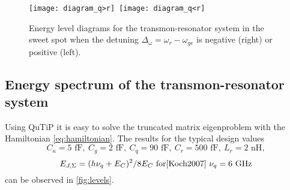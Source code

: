 \begin{figure}[h]
\centering
\texttt{[image: diagram\_q>r]}\ \texttt{[image: diagram\_q<r]}
\caption{Energy level diagrams for the transmon-resonator system in the sweet spot when the detuning $\Delta_\omega = \omega_r-\omega_{ge}$ is negative (right) or positive (left).}
\label{fig:diagram}
\end{figure}

\subsection{Energy spectrum of the transmon-resonator system}

Using QuTiP\cite{Johansson2011} it is easy to solve the truncated matrix eigenproblem with the Hamiltonian \eqref{eq:hamiltonian}. The results for the typical design values
$$
C_\kappa = 5 \text{ fF},\ C_g = 2 \text{ fF},\ C_q = 90 \text{ fF},\ C_r = 500 \text{ fF},\ L_r = 2 \text{ nH}, $$
$$E_{J, \Sigma} = (h \nu_q + E_C)^2/8 E_C\ \text{for\cite{Koch2007}}\ \nu_q = 6\ \text{GHz}
$$
can be observed in \autoref{fig:levels}.

